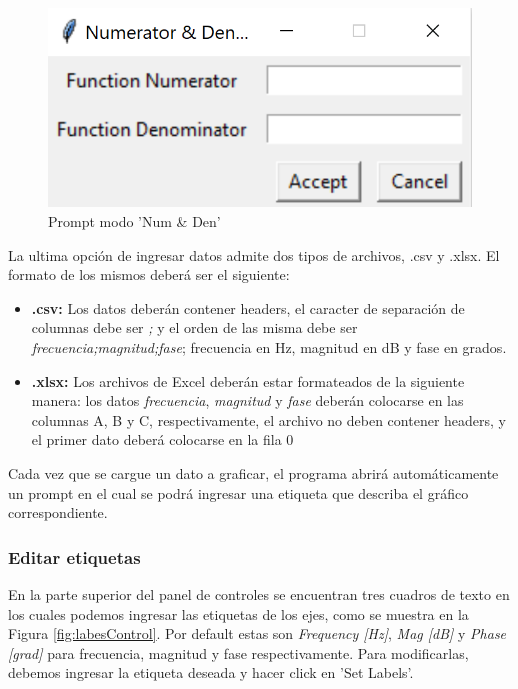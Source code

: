 \begin{figure}[ht]
\centering
\includegraphics[scale=0.3]{resources/numDenPrompt.png}
\caption{Prompt modo 'Num \& Den'}
\label{fig:numDenPrompt}
\end{figure}

La ultima opción de ingresar datos admite dos tipos de archivos, .csv y .xlsx. El formato de los mismos deberá ser el siguiente:
\begin{itemize}
\item \textbf{.csv: }Los datos deberán contener headers, el caracter de separación de columnas debe ser \emph{;} y el orden de las misma debe ser \emph{frecuencia;magnitud;fase}; frecuencia en Hz, magnitud en dB y fase en grados.
\item \textbf{.xlsx: }Los archivos de Excel deberán estar formateados de la siguiente manera: los datos \emph{frecuencia}, \emph{magnitud} y \emph{fase} deberán colocarse en las columnas A, B y C, respectivamente, el archivo no deben contener headers, y el primer dato deberá colocarse en la fila 0
\end{itemize}

Cada vez que se cargue un dato a graficar, el programa abrirá automáticamente un prompt en el cual se podrá ingresar una etiqueta que describa el gráfico correspondiente.

\subsubsection{Editar etiquetas}

En la parte superior del panel de controles se encuentran tres cuadros de texto en los cuales podemos ingresar las etiquetas de los ejes, como se muestra en la Figura \ref{fig:labesControl}. Por default estas son \emph{Frequency [Hz]}, \emph{Mag [dB]} y \emph{Phase [grad]} para frecuencia, magnitud y fase respectivamente. Para modificarlas, debemos ingresar la etiqueta deseada y hacer click en 'Set Labels'.

